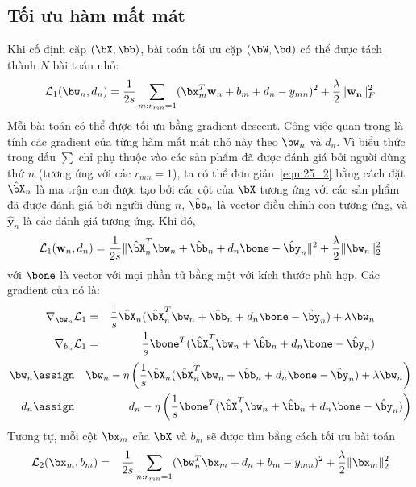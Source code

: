 \subsection{Tối ưu hàm mất mát }
Khi cố định cặp $(\bX, \bb)$, bài toán tối ưu cặp $(\bW, \bd)$ có thể được tách
thành $N$ bài toán nhỏ:
\begin{equation} 
\label{eqn:25_2}
\mathcal{L}_1(\bw_n, d_n) = \frac{1}{2s} \sum_{m:r_{mn} = 1}
(\bx_m^T\mathbf{w}_n + b_m + d_n - y_{mn})^2 + \frac{\lambda}{2}
\|\mathbf{w_n}\|_F^2
\end{equation} 
Mỗi bài toán có thể được tối ưu bằng gradient descent. Công việc quan trọng là tính các gradient của từng hàm mất mát nhỏ này theo $\bw_n$ và
$d_n$.
 Vì biểu thức trong dấu $\sum$ chỉ phụ thuộc vào các sản phẩm đã được đánh
giá bởi người dùng thứ $n$ (tương ứng với các $r_{mn}  = 1$), ta có thể đơn
giản~\eqref{eqn:25_2} bằng cách đặt $\hat{\bX}_n$ là ma trận con được tạo bởi
các cột của $\bX$ tương ứng với các sản phẩm đã được đánh giá bởi
người dùng $n$, $\hat{\bb}_n$ là vector điều chỉnh con tương ứng, và
$\hat{\mathbf{y}}_n$ là các đánh giá tương ứng. Khi đó,
\begin{equation} 
\mathcal{L}_1(\mathbf{w}_n, d_n) = \frac{1}{2s} \|\hat{\bX}^T_n\bw_n +
\hat{\bb}_n
+ d_n\bone - \hat{\by}_n\|^2 + \frac{\lambda}{2}\|\bw_n\|_2^2
\end{equation} 
với $\bone$ là vector với mọi phần tử bằng một với kích thước phù hợp. Các gradient 
của nó là:
\begin{eqnarray} 
\nabla_{\bw_n}\mathcal{L}_1
&=&
\frac{1}{s}\hat{\bX}_n(\hat{\bX}_n^T\bw_n + \hat{\bb}_n + d_n\bone -
\hat{\by}_n) + \lambda \bw_n \\\
\nabla_{b_n}\mathcal{L}_1
&=&
\frac{1}{s}\bone^T(\hat{\bX}_n^T\bw_n + \hat{\bb}_n + d_n\bone -
\hat{\by}_n)
\end{eqnarray} 
\begin{eqnarray} 
\bw_n &\assign& \bw_n - \eta \left(\frac{1}{s}\hat{\bX}_n(\hat{\bX}_n^T\bw_n +
\hat{\bb}_n + d_n\bone - \hat{\by}_n) + \lambda \bw_n\right) \\
d_n &\assign& d_n - \eta \left(\frac{1}{s}\bone^T(\hat{\bX}_n^T\bw_n + \hat{\bb}_n + d_n\bone -
\hat{\by}_n)\right)
\end{eqnarray} 
Tương tự, mỗi cột $\bx_m$ của $\bX$ và $b_m$ sẽ được tìm bằng cách tối ưu bài toán 
\begin{eqnarray} 
\label{eqn:25_xm}
\mathcal{L}_2(\bx_m, b_m) &=& \frac{1}{2s}\sum_{n:r_{mn} = 1}
(\bw_n^T\bx_m + d_n  + b_m - y_{mn})^2 + \frac{\lambda}{2}\|\bx_m\|_2^2
\end{eqnarray}
